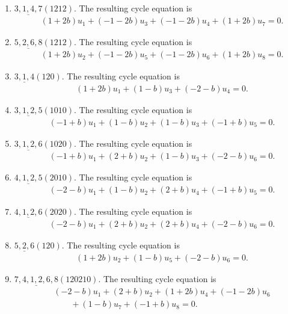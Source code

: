 \documentclass[11pt]{article}
\begin{document}
\begin{enumerate}[label=(\arabic*)]
\item $ \underline{3,1,4,7}(1212) $.  The resulting cycle equation is
\[
\begin{aligned}
&\left(1 + 2b\right)u_{1} + \left(-1 - 2b\right)u_{3} + \left(-1 - 2b\right)u_{4} + \left(1 + 2b\right)u_{7}=0.
\end{aligned}
\]
\item $ \underline{5,2,6,8}(1212) $.  The resulting cycle equation is
\[
\begin{aligned}
&\left(1 + 2b\right)u_{2} + \left(-1 - 2b\right)u_{5} + \left(-1 - 2b\right)u_{6} + \left(1 + 2b\right)u_{8}=0.
\end{aligned}
\]
\item $ \underline{3,1,4}(120) $.  The resulting cycle equation is
\[
\begin{aligned}
&\left(1 + 2b\right)u_{1} + \left(1 - b\right)u_{3} + \left(-2 - b\right)u_{4}=0.
\end{aligned}
\]
\item $ \underline{3,1,2,5}(1010) $.  The resulting cycle equation is
\[
\begin{aligned}
&\left(-1 + b\right)u_{1} + \left(1 - b\right)u_{2} + \left(1 - b\right)u_{3} + \left(-1 + b\right)u_{5}=0.
\end{aligned}
\]
\item $ \underline{3,1,2,6}(1020) $.  The resulting cycle equation is
\[
\begin{aligned}
&\left(-1 + b\right)u_{1} + \left(2 + b\right)u_{2} + \left(1 - b\right)u_{3} + \left(-2 - b\right)u_{6}=0.
\end{aligned}
\]
\item $ \underline{4,1,2,5}(2010) $.  The resulting cycle equation is
\[
\begin{aligned}
&\left(-2 - b\right)u_{1} + \left(1 - b\right)u_{2} + \left(2 + b\right)u_{4} + \left(-1 + b\right)u_{5}=0.
\end{aligned}
\]
\item $ \underline{4,1,2,6}(2020) $.  The resulting cycle equation is
\[
\begin{aligned}
&\left(-2 - b\right)u_{1} + \left(2 + b\right)u_{2} + \left(2 + b\right)u_{4} + \left(-2 - b\right)u_{6}=0.
\end{aligned}
\]
\item $ \underline{5,2,6}(120) $.  The resulting cycle equation is
\[
\begin{aligned}
&\left(1 + 2b\right)u_{2} + \left(1 - b\right)u_{5} + \left(-2 - b\right)u_{6}=0.
\end{aligned}
\]
\item $ \underline{7,4,1,2,6,8}(120210) $.  The resulting cycle equation is
\[
\begin{aligned}
&\left(-2 - b\right)u_{1} + \left(2 + b\right)u_{2} + \left(1 + 2b\right)u_{4} + \left(-1 - 2b\right)u_{6}\\ &\qquad  + \left(1 - b\right)u_{7} + \left(-1 + b\right)u_{8}=0.
\end{aligned}
\]
\end{enumerate}
\end{document}
